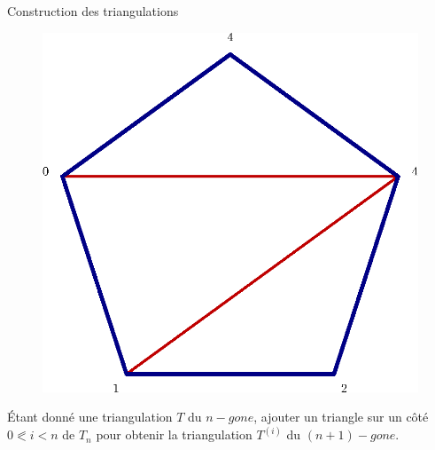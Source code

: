 \documentclass[french,xcolor=dvipsnames]{beamer}
\begin{document}
\begin{frame}{Construction des triangulations}
\begin{figure}
				\includegraphics[scale=0.2]{triangu_5.eps}
			\end{figure}
			Étant donné une triangulation $T$ du $n-gone$, ajouter un triangle sur un côté $0 \eqslantless i < n$ de $T_{n}$ pour obtenir la triangulation $T^{(i)}$ du $(n+1)-gone$.
		
		\end{frame}
\end{document}
